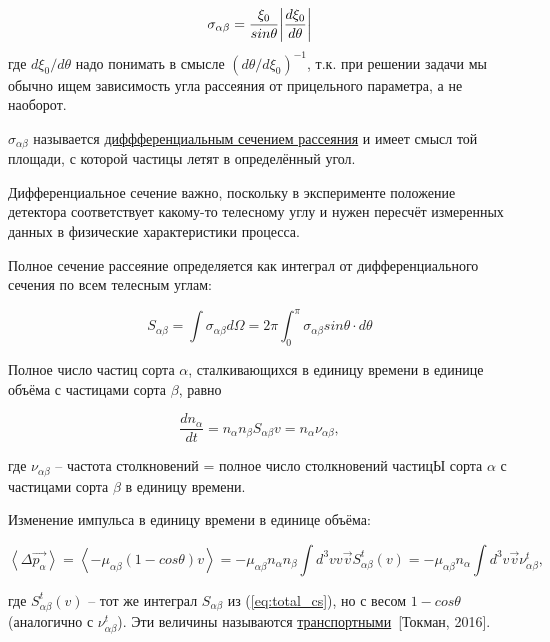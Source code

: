 \documentclass[10pt, a4paper]{article}
\numberwithin{equation}{section}
\newcommand{\Tokman}{~[Токман, 2016]}
\begin{document}
\begin{equation} \label{eq:transport_cs}
	\sigma_{\alpha\beta} = \frac{\xi_0}{sin\theta}\abs{\frac{d\xi_0}{d\theta}}
\end{equation}
где $d\xi_0/d\theta$ надо понимать в смысле $(d\theta/d\xi_0)^{-1}$, т.к. при решении задачи мы обычно ищем зависимость угла рассеяния от прицельного параметра, а не наоборот.

$\sigma_{\alpha\beta}$ называется \uline{диффференциальным сечением рассеяния} и имеет смысл той площади, с которой частицы летят в определённый угол.

Дифференциальное сечение важно, поскольку в эксперименте положение детектора соответствует какому-то телесному углу и нужен пересчёт измеренных данных в физические характеристики процесса.

Полное сечение рассеяние определяется как интеграл от дифференциального сечения по всем телесным углам:

\begin{equation} \label{eq:total_cs}
	S_{\alpha\beta} = \int \sigma_{\alpha\beta} d\Omega = 2 \pi \int_{0}^{\pi} \sigma_{\alpha\beta} sin\theta \cdot d\theta
\end{equation}

Полное число частиц сорта $\alpha$, сталкивающихся в единицу времени в единице объёма с частицами сорта $\beta$, равно

\begin{equation*}
	\frac{dn_\alpha}{dt} = n_\alpha n_\beta S_{\alpha\beta} v = n_\alpha\nu_{\alpha\beta},
\end{equation*}

где $\nu_{\alpha\beta}$ -- частота столкновений = полное число столкновений частицЫ сорта $\alpha$ с частицами сорта $\beta$ в единицу времени.

Изменение импульса в единицу времени в единице объёма:

\begin{equation*}
	\left\langle \Delta \vec{p_\alpha}\right\rangle = \left\langle -\mu_{\alpha\beta}(1-cos\theta)v \right\rangle = -\mu_{\alpha\beta}n_\alpha n_\beta \int d^3v v \vec{v} S_{\alpha\beta}^t(v) = -\mu_{\alpha\beta}n_\alpha\int d^3v \vec{v}\nu_{\alpha\beta}^t,
\end{equation*}

где $S_{\alpha\beta}^t(v)$ -- тот же интеграл $S_{\alpha\beta}$ из (\ref{eq:total_cs}), но с весом $1-cos\theta$ (аналогично с $\nu_{\alpha\beta}^t$). Эти величины называются \uline{транспортными}\Tokman.
\end{document}
